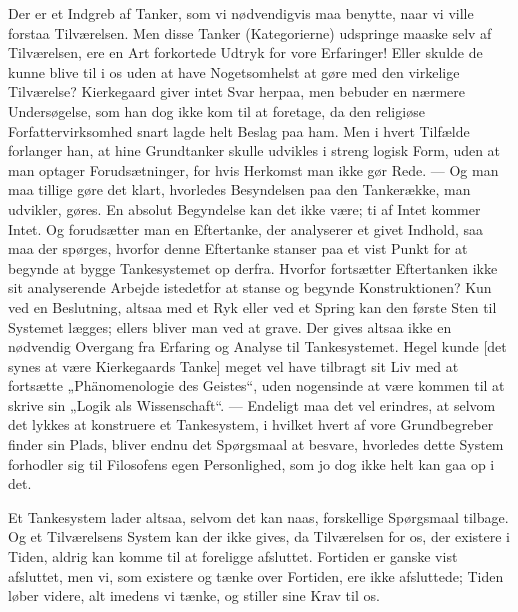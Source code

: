 \documentclass[12pt,a4paper,openany]{book}
\newcommand{\opage}[1]{\marginnote{\footnotesize\textit{[#1]}}}
\begin{document}
Der er et Indgreb af Tanker, som vi nødvendigvis maa benytte, naar vi ville
forstaa Tilværelsen. Men disse Tanker (Kategorierne) udspringe maaske selv af
Tilværelsen, ere en Art forkortede Udtryk for vore Erfaringer! Eller skulde de
kunne blive til i os uden at have Nogetsomhelst at gøre med den virkelige
Tilværelse? Kierkegaard giver intet Svar herpaa, men bebuder en nærmere
Undersøgelse, som han dog ikke kom til at foretage, da den religiøse
Forfattervirksomhed snart lagde helt Beslag paa ham. Men i hvert Tilfælde
forlanger han, at hine Grundtanker skulle udvikles i streng logisk Form, uden
at man optager Forudsætninger, for hvis Herkomst man ikke gør Rede. --- Og man
maa tillige gøre det klart, hvorledes Besyndelsen paa den Tankerække, man
udvikler, gøres. En absolut Begyndelse kan det ikke være; ti
\setcounter{footnote}{0}%
\opage{152}af Intet kommer Intet. Og forudsætter man en Eftertanke, der
analyserer et givet Indhold, saa maa der spørges, hvorfor denne Eftertanke
stanser paa et vist Punkt for at begynde at bygge Tankesystemet op derfra.
Hvorfor fortsætter Eftertanken ikke sit analyserende Arbejde istedetfor at
stanse og begynde Konstruktionen? Kun ved en Beslutning, altsaa med et Ryk
eller ved et Spring kan den første Sten til Systemet lægges; ellers bliver man
ved at grave. Der gives altsaa ikke en nødvendig Overgang fra Erfaring og
Analyse til Tankesystemet. Hegel kunde [det synes at være Kierkegaards Tanke]
meget vel have tilbragt sit Liv med at fortsætte „Phänomenologie des Geistes“,
uden nogensinde at være kommen til at skrive sin „Logik als Wissenschaft“. ---
Endeligt maa det vel erindres, at selvom det lykkes at konstruere et
Tankesystem, i hvilket hvert af vore Grundbegreber finder sin Plads, bliver
endnu det Spørgsmaal at besvare, hvorledes dette System forhodler sig til
Filosofens egen Personlighed, som jo dog ikke helt kan gaa op i det.

Et Tankesystem lader altsaa, selvom det kan naas, forskellige Spørgsmaal
tilbage. Og et Tilværelsens System kan der ikke gives, da Tilværelsen for os,
der existere i Tiden, aldrig kan komme til at foreligge afsluttet. Fortiden er
ganske vist afsluttet, men vi, som existere og tænke over Fortiden, ere ikke
afsluttede; Tiden løber videre, alt imedens vi tænke, og stiller sine Krav til os.
\end{document}
